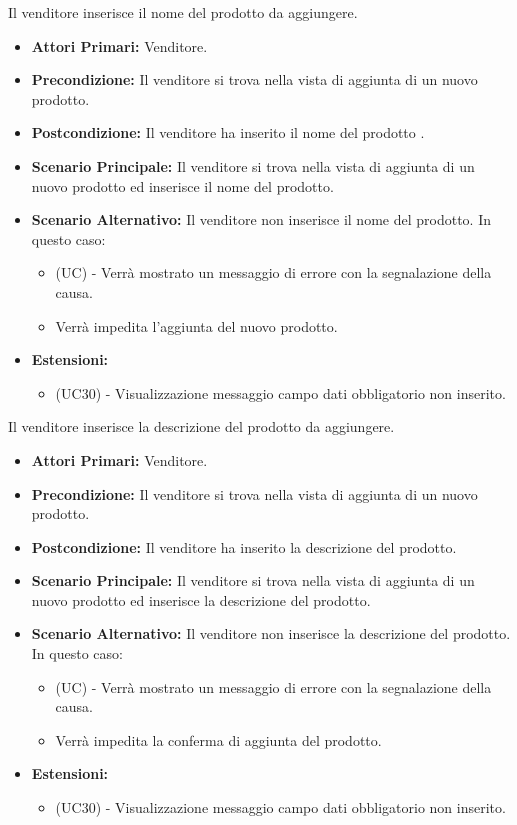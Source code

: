 \resetSubUC

Il venditore inserisce il nome del prodotto da aggiungere.
\begin{itemize}
    \item \textbf{Attori Primari:} Venditore.
    \item \textbf{Precondizione:} Il venditore si trova nella vista di aggiunta di un nuovo prodotto.
    \item \textbf{Postcondizione:} Il venditore ha inserito il nome del prodotto .
    \item \textbf{Scenario Principale:} Il venditore si trova nella vista di aggiunta di un nuovo prodotto ed inserisce il nome del prodotto.
    \item \textbf{Scenario Alternativo:} Il venditore non inserisce il nome del prodotto. In questo caso:
    \begin{itemize}
        \item (UC) - Verrà mostrato un messaggio di errore con la segnalazione della causa.
        \item Verrà impedita l'aggiunta del nuovo prodotto.
    \end{itemize}
    \item \textbf{Estensioni:}
    \begin{itemize}
        \item (UC30) - Visualizzazione messaggio campo dati obbligatorio non inserito.
    \end{itemize}
\end{itemize}

Il venditore inserisce la descrizione del prodotto da aggiungere.
\begin{itemize}
    \item \textbf{Attori Primari:} Venditore.
    \item \textbf{Precondizione:} Il venditore si trova nella vista di aggiunta di un nuovo prodotto.
    \item \textbf{Postcondizione:} Il venditore ha inserito la descrizione del prodotto.
    \item \textbf{Scenario Principale:} Il venditore si trova nella vista di aggiunta di un nuovo prodotto ed inserisce la descrizione del prodotto.
    \item \textbf{Scenario Alternativo:} Il venditore non inserisce la descrizione del prodotto. In questo caso:
    \begin{itemize}
        \item (UC) - Verrà mostrato un messaggio di errore con la segnalazione della causa.
        \item Verrà impedita la conferma di aggiunta del prodotto.
    \end{itemize}
    \item \textbf{Estensioni:}
    \begin{itemize}
        \item (UC30) - Visualizzazione messaggio campo dati obbligatorio non inserito.
    \end{itemize}
\end{itemize}

